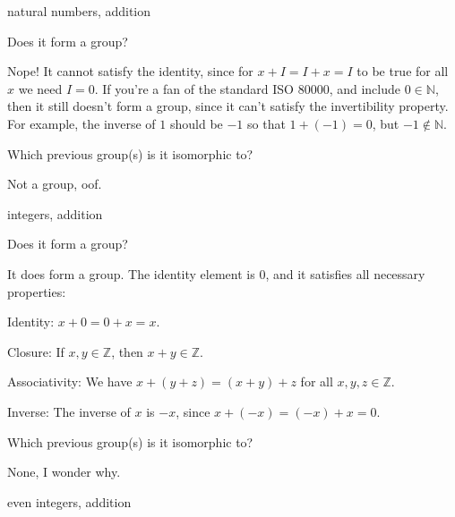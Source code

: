 \documentclass[../key.tex]{subfiles}
\begin{document}
\begin{inner_problem}[start=1]
\item natural numbers, addition
\end{inner_problem}

\begin{iinner_problem}[start=1]
\item Does it form a group?
\end{iinner_problem}

\noindent Nope! It cannot satisfy the identity, since for $x+I=I+x=I$ to be true for all $x$ we need $I=0$. If you're a fan of the standard ISO 80000, and include $0\in\mathbb{N}$, then it still doesn't form a group, since it can't satisfy the invertibility property. For example, the inverse of $1$ should be $-1$ so that $1+(-1)=0$, but $-1 \not\in \mathbb{N}$.

\begin{iinner_problem}
\item Which previous group(s) is it isomorphic to?
\end{iinner_problem}

\noindent Not a group, oof.

\begin{inner_problem}
\item integers, addition
\end{inner_problem}

\begin{iinner_problem}[start=1]
\item Does it form a group?
\end{iinner_problem}

\noindent It does form a group. The identity element is $0$, and it satisfies all necessary properties:

Identity: $x+0=0+x=x$.

Closure: If $x,y\in \mathbb{Z}$, then $x+y\in\mathbb{Z}$.

Associativity: We have $x+(y+z)=(x+y)+z$ for all $x,y,z\in\mathbb{Z}$.

Inverse: The inverse of $x$ is $-x$, since $x+(-x)=(-x)+x=0$.

\begin{iinner_problem}
\item Which previous group(s) is it isomorphic to?
\end{iinner_problem}

\noindent None, I wonder why.

\begin{inner_problem}
\item even integers, addition
\end{inner_problem}
\end{document}
